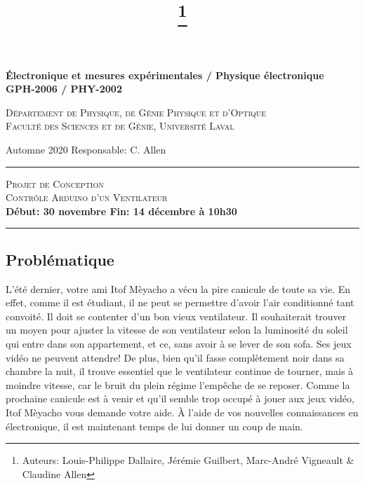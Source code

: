 \documentclass[english,french,12pt]{article}
\title{\vspace{-7em}\thanks{Auteurs: Louis-Philippe Dallaire, Jérémie Guilbert, Marc-André Vigneault \& Claudine Allen}}
\date{}
\begin{document}
\maketitle\thispagestyle{fancy}
%
%
\begin{center}
    \textbf{\large{Électronique et mesures expérimentales / Physique électronique}}\\
    \vspace{0.2em}
    \textbf{GPH-2006 / PHY-2002}

    \textsc{Département de Physique, de Génie Physique et d'Optique\\
    Faculté des Sciences et de Génie, Université Laval}
\end{center}

\vspace{-1em}
\noindent Automne 2020 \hfill Responsable: C. Allen\par
\vspace{0.2em}
\hrule
\vspace{0.5em}
\centering
    \textsc{Projet de Conception\\
    Contrôle Arduino d'un Ventilateur}\\
\vspace{0.5em}
\textbf{Début: 30 novembre \hfill Fin: 14 décembre à 10h30}\par
\vspace{0.4em}
\hrule
\justify
%
\vspace{-1.5em}
\subsection*{Problématique}
\vspace{-0.5em}
L’été dernier, votre ami Itof Mèyacho a vécu la pire canicule de toute sa vie. En effet, comme il est étudiant, il ne peut se permettre d’avoir l’air conditionné tant convoité. Il doit se contenter d’un bon vieux ventilateur. Il souhaiterait trouver un moyen pour ajuster la vitesse de son ventilateur selon la luminosité du soleil qui entre dans son appartement, et ce, sans avoir à se lever de son sofa. Ses jeux vidéo ne peuvent attendre! De plus, bien qu’il fasse complètement noir dans sa chambre la nuit, il trouve essentiel que le ventilateur continue de tourner, mais à moindre vitesse, car le bruit du plein régime l’empêche de se reposer. Comme la prochaine canicule est à venir et qu’il semble trop occupé à jouer aux jeux vidéo, Itof Mèyacho vous demande votre aide. À l'aide de vos nouvelles connaissances en électronique, il est maintenant temps de lui donner un coup de main.
\end{document}
